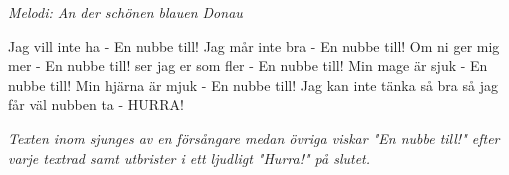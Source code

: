 {\footnotesize\textit{Melodi: An der schönen blauen Donau}}\par
\vspace{10pt}
{Jag vill inte ha} - En nubbe till!
{Jag mår inte bra} - En nubbe till!
{Om ni ger mig mer} - En nubbe till!
{ser jag er som fler} - En nubbe till!
{Min mage är sjuk} - En nubbe till!
{Min hjärna är mjuk} - En nubbe till!
{Jag kan inte tänka så bra}
{så jag får väl nubben ta} - HURRA!
\par
\vspace{10pt}
{\footnotesize\textit{Texten inom {} sjunges av en försångare medan övriga viskar "En nubbe till!" efter varje textrad samt utbrister i ett ljudligt "Hurra!" på slutet.}}
